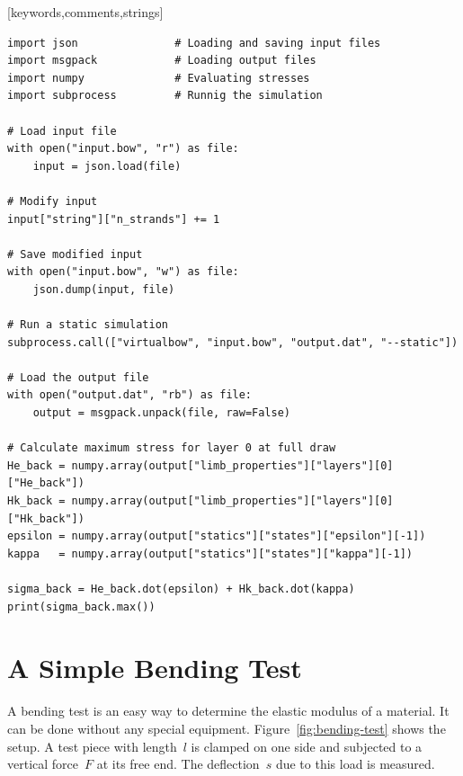 \documentclass[12pt]{article}
\begin{document}

[keywords,comments,strings]

\bigskip

\begin{framed}
\begin{lstlisting}[language=mypython, style=mystyle]
import json               # Loading and saving input files
import msgpack            # Loading output files
import numpy              # Evaluating stresses
import subprocess         # Runnig the simulation

# Load input file
with open("input.bow", "r") as file:
    input = json.load(file)

# Modify input
input["string"]["n_strands"] += 1

# Save modified input
with open("input.bow", "w") as file:
    json.dump(input, file)

# Run a static simulation
subprocess.call(["virtualbow", "input.bow", "output.dat", "--static"])

# Load the output file
with open("output.dat", "rb") as file:
    output = msgpack.unpack(file, raw=False)

# Calculate maximum stress for layer 0 at full draw
He_back = numpy.array(output["limb_properties"]["layers"][0]["He_back"])
Hk_back = numpy.array(output["limb_properties"]["layers"][0]["Hk_back"])
epsilon = numpy.array(output["statics"]["states"]["epsilon"][-1])
kappa   = numpy.array(output["statics"]["states"]["kappa"][-1])

sigma_back = He_back.dot(epsilon) + Hk_back.dot(kappa)
print(sigma_back.max()) 
\end{lstlisting}
\end{framed}

\newpage
\section{A Simple Bending Test}
\label{sec:bending-test}

A bending test is an easy way to determine the elastic modulus of a material. It can be done without any special equipment.
Figure~\ref{fig:bending-test} shows the setup. A test piece with length~$l$ is clamped on one side and subjected to a vertical force~$F$ at its free end.
The deflection~$s$ due to this load is measured.
\end{document}
